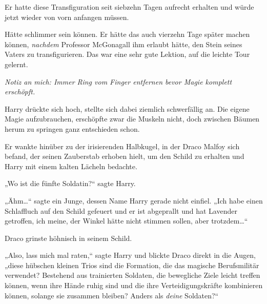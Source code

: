 Er hatte diese Transfiguration seit siebzehn Tagen aufrecht erhalten und würde jetzt wieder von vorn anfangen müssen.

Hätte schlimmer sein können. Er hätte das auch vierzehn Tage später machen können, \emph{nachdem} Professor McGonagall ihm erlaubt hätte, den Stein seines Vaters zu transfigurieren. Das war eine sehr gute Lektion, auf die leichte Tour gelernt.

\emph{Notiz an mich: Immer Ring vom Finger entfernen bevor Magie komplett erschöpft.}

Harry drückte sich hoch, stellte sich dabei ziemlich schwerfällig an. Die eigene Magie aufzubrauchen, erschöpfte zwar die Muskeln nicht, doch zwischen Bäumen herum zu springen ganz entschieden schon.

Er wankte hinüber zu der irisierenden Halbkugel, in der Draco Malfoy sich befand, der seinen Zauberstab erhoben hielt, um den Schild zu erhalten und Harry mit einem kalten Lächeln bedachte.

„Wo ist die fünfte Soldatin?“ sagte Harry.

„Ähm…“ sagte ein Junge, dessen Name Harry gerade nicht einfiel. „Ich habe einen Schlaffluch auf den Schild gefeuert und er ist abgeprallt und hat Lavender getroffen, ich meine, der Winkel hätte nicht stimmen sollen, aber trotzdem…“

Draco grinste höhnisch in seinem Schild.

„Also, lass mich mal raten,“ sagte Harry und blickte Draco direkt in die Augen, „diese hübschen kleinen Trios sind die Formation, die das magische Berufsmilitär verwendet? Bestehend aus trainierten Soldaten, die bewegliche Ziele leicht treffen können, wenn ihre Hände ruhig sind und die ihre Verteidigungskräfte kombinieren können, solange sie zusammen bleiben? Anders als \emph{deine} Soldaten?“

